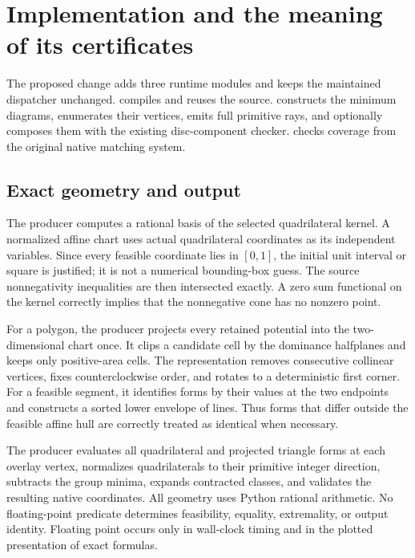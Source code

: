 \section{Implementation and the meaning of its certificates}
\label{sec:implementation}

The proposed change adds three runtime modules and keeps the maintained
dispatcher unchanged.   compiles and reuses the
source.   constructs the minimum diagrams,
enumerates their vertices, emits full primitive rays, and optionally
composes them with the existing disc-component checker.
 checks coverage from the original
native matching system.

\subsection{Exact geometry and output}

The producer computes a rational basis of the selected quadrilateral
kernel.  A normalized affine chart uses actual quadrilateral
coordinates as its independent variables.  Since every feasible
coordinate lies in \([0,1]\), the initial unit interval or square
is justified; it is not a numerical bounding-box guess.  The source
nonnegativity inequalities are then intersected exactly.  A zero
sum functional on the kernel correctly implies that the
nonnegative cone has no nonzero point.

For a polygon, the producer projects every retained potential into
the two-dimensional chart once.  It clips a candidate cell by the
dominance halfplanes and keeps only positive-area cells.  The
representation removes consecutive collinear vertices, fixes
counterclockwise order, and rotates to a deterministic first corner.
For a feasible segment, it identifies forms by their values at the
two endpoints and constructs a sorted lower envelope of lines.
Thus forms that differ outside the feasible affine hull are
correctly treated as identical when necessary.

The producer evaluates all quadrilateral and projected triangle
forms at each overlay vertex, normalizes quadrilaterals to their
primitive integer direction, subtracts the group minima, expands
contracted classes, and validates the resulting native coordinates.
All geometry uses Python rational arithmetic.  No floating-point
predicate determines feasibility, equality, extremality, or output
identity.  Floating point occurs only in wall-clock timing and
in the plotted presentation of exact formulas.

